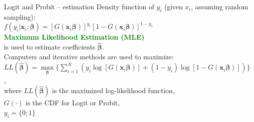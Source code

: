 \documentclass[usenames,dvipsnames]{beamer}
\newcommand{\Duck}[1]{\underset{#1}{\max}}
\begin{document}
\begin{frame}{Logit and Probit – estimation}
Density function of $y_i$ (given $x_i$, assuming random sampling):\\
\vspace{0.2cm}
$f(y_i | \bm{x}_i; \bm{\beta}) = [G(\bm{x}_i \bm{\beta})]^{y_i} [1-G(\bm{x}_i \bm{\beta})]^{1-y_i}$\\ 
\vspace{0.2cm}
\textcolor{Green}{\textbf{Maximum Likelihood Estimation (MLE)}} 
\\is used to estimate coefficients $\hat{\bm{\beta}}$. \\
\vspace{0.2cm}
Computers and iterative methods are used to maximize:\\
\bigskip
$LL(\hat{\bm{\beta}}) = \Duck{\bm{\beta}} \{ \sum_{i=1}^N (y_i \log[G(\bm{x}_i \bm{\beta})] + (1-y_i) \log[1-G(\bm{x}_i \bm{\beta})]) \}$,\\
\bigskip
where $LL(\hat{\bm{\beta}})$ is the maximized log-likelihood function, \\
\smallskip
\hspace*{1cm} $G(\cdot)$ is the CDF for Logit or Probit,\\
\smallskip
\hspace*{1cm} $y_i = \{0;1\}$
\end{frame}
\end{document}

